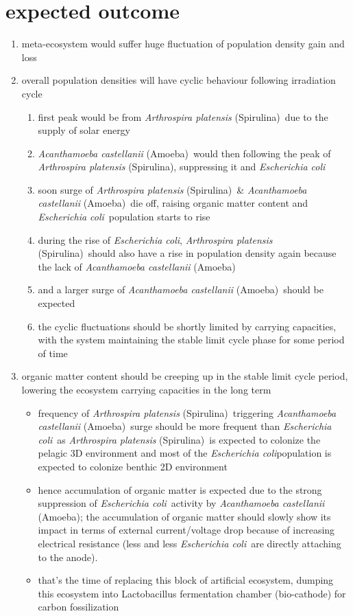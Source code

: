\documentclass[a4paper,11pt]{article}
\newcommand{\ec}{\textit{Escherichia coli}}
\newcommand{\am}{\textit{Acanthamoeba castellanii} (Amoeba)}
\newcommand{\ap}{\textit{Arthrospira platensis} (Spirulina)}
\begin{document}
    \section{expected outcome}
    \begin{enumerate}
        \item meta-ecosystem would suffer huge fluctuation of population density gain and loss
        \item overall population densities will have cyclic behaviour following irradiation cycle
        \begin{enumerate}
            \item first peak would be from \ap\ due to the supply of solar energy
            \item \am\ would then following the peak of \ap, suppressing it and \ec
            \item soon surge of \ap\ \& \am\ die off, raising organic matter content and \ec\ population starts to rise
            \item during the rise of \ec, \ap\ should also have a rise in population density again because the lack of \am
            \item and a larger surge of \am\ should be expected
            \item the cyclic fluctuations should be shortly limited by carrying capacities, with the system maintaining the stable limit cycle phase for some period of time
        \end{enumerate}
        \item organic matter content should be creeping up in the stable limit cycle period, lowering the ecosystem carrying capacities in the long term
        \begin{itemize}
            \item frequency of \ap\ triggering \am\ surge should be more frequent than \ec\ as \ap\ is expected to colonize the pelagic 3D environment and most of the \ec population is expected to colonize benthic 2D environment
            \item hence accumulation of organic matter is expected due to the strong suppression of \ec\ activity by \am; the accumulation of organic matter should slowly show its impact in terms of external current/voltage drop because of increasing electrical resistance (less and less \ec\ are directly attaching to the anode).
            \item that's the time of replacing this block of artificial ecosystem, dumping this ecosystem into Lactobacillus fermentation chamber (bio-cathode) for carbon fossilization
        \end{itemize}
    \end{enumerate}
    
\end{document}
